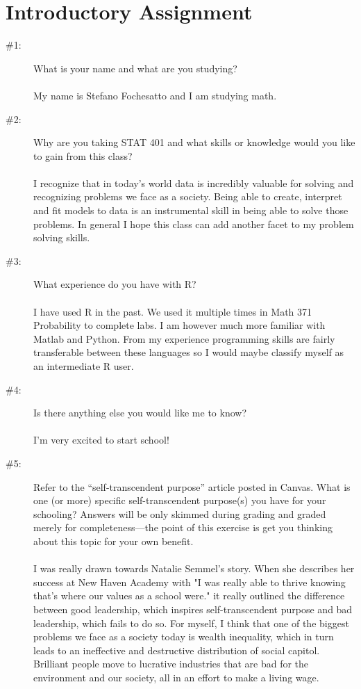 \documentclass[12pt]{article}
\theoremstyle{homework}
\begin{document}
\section*{Introductory Assignment}

\begin{description}
\item[\#1:] What is your name and what are you studying?\\ \\
My name is Stefano Fochesatto and I am studying math.  

\newpage
\item[\#2:] Why are you taking STAT 401 and what skills or knowledge would you like to gain from this class?\\ \\
  I recognize that in today's world data is incredibly valuable for solving and recognizing problems we face as a society. Being able to create, interpret and 
  fit models to data is an instrumental skill in being able to solve those problems. In general I hope this class can add another facet to my problem solving skills.

  \newpage

\item[\#3:]What experience do you have with R?\\ \\
  I have used R in the past. We used it multiple times in Math 371 Probability to complete labs. I am however much more familiar with Matlab and Python. From my experience 
  programming skills are fairly transferable between these languages so I would maybe classify myself as an intermediate R user. 
  \newpage

\item[\#4:]Is there anything else you would like me to know?\\ \\
  I'm very excited to start school!

  \newpage

\item[\#5:]Refer to the “self-transcendent purpose” article posted in Canvas.  
What is one (or more) specific self-transcendent purpose(s) you have for your schooling?  Answers will be only skimmed during
grading and graded merely for completeness—the point of this exercise is get you thinking about this topic for your own benefit.\\ \\
  I was really drawn towards Natalie Semmel's story. When she describes her success at New Haven Academy with "I was really able to thrive knowing that's where our values as a school were."
  it really outlined the difference between good leadership, which inspires self-transcendent purpose and bad leadership, which fails to do so. For myself, I think that one of the biggest problems we face as a 
  society today is wealth inequality, which in turn leads to an ineffective and destructive distribution of social capitol. Brilliant people move to lucrative industries that are bad for the environment and our society, all
  in an effort to make a living wage.  



\end{description}
\end{document}
